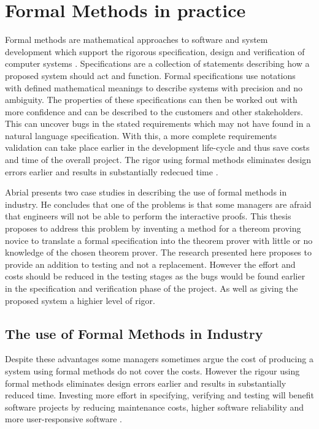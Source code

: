 \section{Formal Methods in practice}
\label{sec:formnot}

Formal methods are mathematical approaches to software and system development which support the rigorous specification, design and verification of computer systems \cite{fmeurope}. Specifications are a collection of statements describing how a proposed system should act and function. Formal specifications use notations with defined mathematical meanings to describe systems with precision and no ambiguity. The properties of these specifications can then be worked out with more confidence and can be described to the customers and other stakeholders. This can uncover bugs in the stated requirements which may not have found in a natural language specification. With this, a more complete requirements validation can take place earlier in the development life-cycle and thus save costs and time of the overall project. The rigor using formal methods eliminates design errors earlier and results in substantially redecued time \cite{benefitsofform}. 

Abrial presents two case studies in \cite{10.1145/1134285.1134406} describing the use of formal methods in industry. He concludes that one of the problems is that some managers are afraid that engineers will not be able to perform the interactive proofs. This thesis proposes to address this problem by inventing a method for a thereom proving novice to translate a formal specification into the theorem prover with little or no knowledge of the chosen theorem prover. The research presented here proposes to provide an addition to testing and not a replacement. However the effort and costs should be reduced in the testing stages as the bugs would be found earlier in the specification and verification phase of the project. As well as giving the proposed system a highier level of rigor.

\subsection{The use of Formal Methods in Industry}

Despite these advantages some managers sometimes argue the cost of producing a system using formal methods do not cover the costs. However the rigour using formal methods eliminates design errors earlier and results in substantially reduced time. Investing more effort in specifying, verifying and testing will benefit software projects by reducing maintenance costs, higher software reliability and more user-responsive software \cite{chantatub}.

